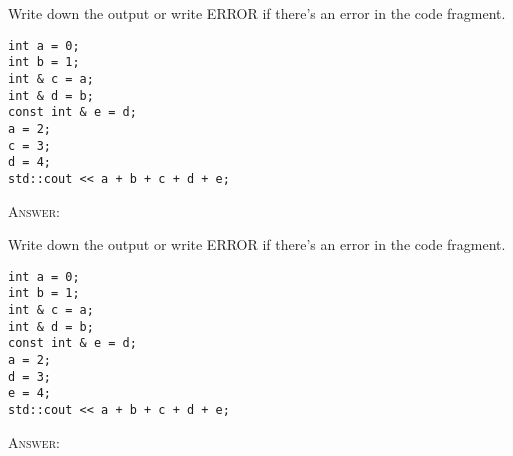 \nextq
Write down the output or write ERROR if there's an error in the
code fragment.
\begin{Verbatim}[frame=single,fontsize=\footnotesize]
int a = 0;
int b = 1;
int & c = a;
int & d = b;
const int & e = d;
a = 2;
c = 3;
d = 4;
std::cout << a + b + c + d + e;
\end{Verbatim}
\textsc{Answer:}\vspace{-2mm}
\begin{answercode}

\end{answercode}

\nextq
Write down the output or write ERROR if there's an error in the
code fragment.
\begin{Verbatim}[frame=single,fontsize=\footnotesize]
int a = 0;
int b = 1;
int & c = a;
int & d = b;
const int & e = d;
a = 2;
d = 3;
e = 4;
std::cout << a + b + c + d + e;
\end{Verbatim}
\textsc{Answer:}\vspace{-2mm}
\begin{answercode}

\end{answercode}

\newpage

